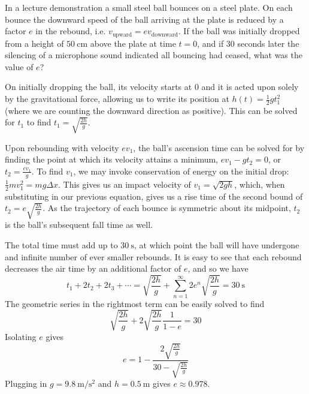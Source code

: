 \documentclass[../feynman-lectures-on-physics.tex]{subfiles}
\begin{document}
\begin{questions}
\begin{solution}
  \end{solution}

	\question In a lecture demonstration a small steel ball bounces on a steel plate. On each bounce the downward speed of the ball arriving at the plate is reduced by a factor $e$ in the rebound, i.e. $v_{\mathrm{upward}} = ev_{\mathrm{downward}}$.
	If the ball was initially dropped from a height of $\SI{50}{\centi\meter}$ above the plate at time $t=0$, and if $30$ seconds later the silencing of a microphone sound indicated all bouncing had ceased, what was the value of $e$?

  \begin{solution}
   On initially dropping the ball, its velocity starts at $0$ and it is acted
   upon solely by the gravitational force, allowing us to write its position at
   $h(t)=\frac{1}{2}gt_1^2$ (where we are counting the downward direction as
   positive). This can be solved for $t_1$ to find $t_1=\sqrt{\frac{2h}{g}}$.

   Upon rebounding with velocity $ev_1$, the ball's ascension time can be solved for
   by finding the point at which its velocity attains a minimum, $ev_1 -
   gt_2=0$, or $t_2 = \frac{ev_1}{g}$. To find $v_1$, we may invoke conservation
   of energy on the initial drop: $\frac{1}{2}mv_1^2 = mg\Delta{x}$. This gives
   us an impact velocity of $v_1=\sqrt{2gh}$, which, when substituting in our
   previous equation, gives us a rise time of the second bound of $t_2 =
   e\sqrt{\frac{2h}{g}}$. As the trajectory of each bounce is symmetric about
   its midpoint, $t_2$ is the ball's subsequent fall time as well.

   The total time must add up to $\SI{30}{\second}$, at which point the ball
   will have undergone and infinite number of ever smaller rebounds.
   It is easy to see that each rebound decreases the air time by an additional
   factor of $e$, and so we have
   \[
     t_1 + 2t_2 + 2t_3 + \cdots = \sqrt{\frac{2h}{g}} +
     \sum_{n=1}^{\infty}2e^n\sqrt{\frac{2h}{g}} = \SI{30}{\second}
   \]
   The geometric series in the rightmost term can be easily solved to find
   \[
     \sqrt{\frac{2h}{g}} + 2\sqrt{\frac{2h}{g}}\frac{1}{1-e} = 30
   \]
   Isolating $e$ gives
   \[
     e = 1 - \frac{2\sqrt{\frac{2h}{g}}}{30 - \sqrt{\frac{2h}{g}}}
   \]
   Plugging in $g = \SI{9.8}{\meter\per\second\squared}$ and $h =
   \SI{0.5}{\meter}$ gives $e \approx 0.978$.
  \end{solution}


\end{questions}
\end{document}
